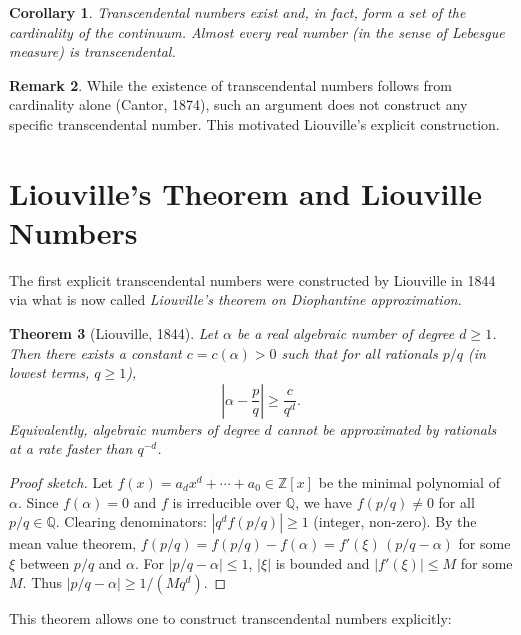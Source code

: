 \documentclass[12pt,a4paper]{amsart}
\newtheorem{theorem}{Theorem}[section]
\newtheorem{corollary}[theorem]{Corollary}
\theoremstyle{definition}
\newtheorem{remark}[theorem]{Remark}
\begin{document}
\begin{corollary}
Transcendental numbers exist and, in fact, form a set of the cardinality
of the continuum. Almost every real number (in the sense of Lebesgue measure)
is transcendental.
\end{corollary}

\begin{remark}
While the existence of transcendental numbers follows from cardinality
alone (Cantor, 1874), such an argument does not construct any
specific transcendental number. This motivated Liouville's explicit construction.
\end{remark}


\section{Liouville's Theorem and Liouville Numbers}
\label{sec:liouville}

The first explicit transcendental numbers were constructed by Liouville in 1844
via what is now called \emph{Liouville's theorem on Diophantine approximation}.

\begin{theorem}[Liouville, 1844]
\label{thm:liouville}
Let $\alpha$ be a real algebraic number of degree $d \geq 1$. Then there exists
a constant $c = c(\alpha) > 0$ such that for all rationals $p/q$ (in lowest
terms, $q \geq 1$),
\[
  \left|\alpha - \frac{p}{q}\right| \geq \frac{c}{q^d}.
\]
Equivalently, algebraic numbers of degree $d$ cannot be approximated by
rationals at a rate faster than $q^{-d}$.
\end{theorem}

\begin{proof}[Proof sketch]
Let $f(x) = a_d x^d + \cdots + a_0 \in \mathbb{Z}[x]$ be the minimal polynomial
of $\alpha$. Since $f(\alpha) = 0$ and $f$ is irreducible over $\mathbb{Q}$,
we have $f(p/q) \neq 0$ for all $p/q \in \mathbb{Q}$.
Clearing denominators: $|q^d f(p/q)| \geq 1$ (integer, non-zero).
By the mean value theorem, $f(p/q) = f(p/q) - f(\alpha) = f'(\xi)\,(p/q - \alpha)$
for some $\xi$ between $p/q$ and $\alpha$. For $|p/q - \alpha| \leq 1$,
$|\xi|$ is bounded and $|f'(\xi)| \leq M$ for some $M$. Thus
$|p/q - \alpha| \geq 1/(M q^d)$.
\end{proof}

This theorem allows one to construct transcendental numbers explicitly:
\end{document}
